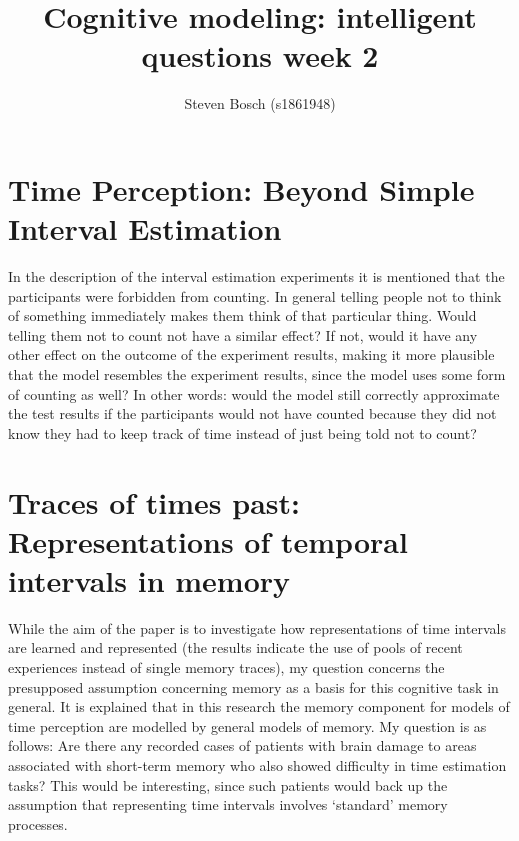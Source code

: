 \documentclass{article}
\title{Cognitive modeling: intelligent questions week 2}
\author{Steven Bosch (s1861948)}
\begin{document}
	
\maketitle
\section{Time Perception: Beyond Simple Interval Estimation}
In the description of the interval estimation experiments it is mentioned that the participants were forbidden from counting. In general telling people not to think of something immediately makes them think of that particular thing. Would telling them not to count not have a similar effect? If not, would it have any other effect on the outcome of the experiment results, making it more plausible that the model resembles the experiment results, since the model uses some form of counting as well? In other words: would the model still correctly approximate the test results if the participants would not have counted because they did not know they had to keep track of time instead of just being told not to count?

\section{Traces of times past: Representations of temporal intervals in memory}
While the aim of the paper is to investigate how representations of time intervals are learned and represented (the results indicate the use of pools of recent experiences instead of single memory traces), my question concerns the presupposed assumption concerning memory as a basis for this cognitive task in general.
It is explained that in this research the memory component for models of time perception are modelled by general models of memory. My question is as follows: Are there any recorded cases of patients with brain damage to areas associated with short-term memory who also showed difficulty in time estimation tasks? This would be interesting, since such patients would back up the assumption that representing time intervals involves `standard' memory processes.
\end{document}
